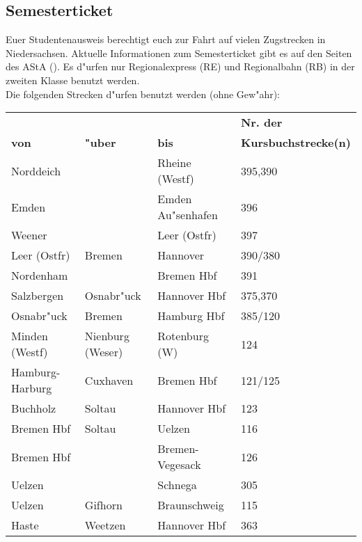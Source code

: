 \onecolumn
\subsection{Semesterticket}
Euer Studentenausweis berechtigt euch zur Fahrt auf vielen Zugstrecken in
Niedersachsen. Aktuelle Informationen zum Semesterticket gibt es auf den Seiten
des AStA ().
Es d"urfen nur Regionalexpress (RE) und Regionalbahn (RB) in der zweiten Klasse
benutzt werden.\\
Die folgenden Strecken d"urfen benutzt werden (ohne Gew"ahr):
\begin{table}[h]
\centering
\begin{tabular}{l|l|l|l}
	& & & \textbf{Nr. der}\\
	\textbf{von} & \textbf{"uber} & \textbf{bis} & \textbf{Kursbuchstrecke(n)}\\
	\hline
	Norddeich        &                      & Rheine (Westf)     & 395,390\\
	Emden            &                      & Emden Au"senhafen  & 396\\
	Weener           &                      & Leer (Ostfr)       & 397\\
	Leer (Ostfr)     & Bremen               & Hannover           & 390/380\\
	Nordenham        &                      & Bremen Hbf         & 391\\
	Salzbergen       & Osnabr"uck           & Hannover Hbf       & 375,370\\
	Osnabr"uck       & Bremen               & Hamburg Hbf        & 385/120\\
	Minden (Westf)   & Nienburg (Weser)     & Rotenburg (W)      & 124\\
	Hamburg-Harburg  & Cuxhaven             & Bremen Hbf         & 121/125\\
	Buchholz         & Soltau               & Hannover Hbf       & 123\\
	Bremen Hbf       & Soltau               & Uelzen             & 116\\
	Bremen Hbf       &                      & Bremen-Vegesack    & 126\\
	Uelzen           &                      & Schnega            & 305\\
	Uelzen           & Gifhorn              & Braunschweig       & 115\\
	Haste            & Weetzen              & Hannover Hbf       & 363\\

\end{tabular}
\end{table}
